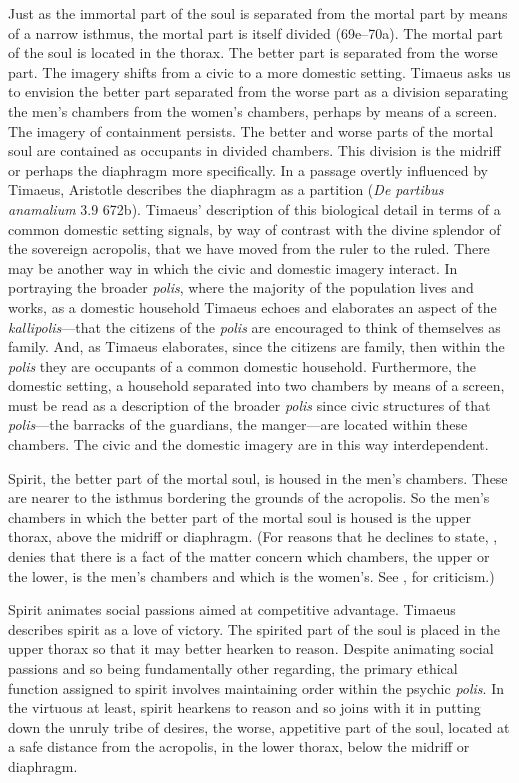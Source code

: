 Just as the immortal part of the soul is separated from the mortal part by means of a narrow isthmus, the mortal part is itself divided (69e--70a). The mortal part of the soul is located in the thorax. The better part is separated from the worse part. The imagery shifts from a civic to a more domestic setting. Timaeus asks us to envision the better part separated from the worse part as a division separating the men's chambers from the women's chambers, perhaps by means of a screen. The imagery of containment persists. The better and worse parts of the mortal soul are contained as occupants in divided chambers. This division is the midriff or perhaps the diaphragm more specifically. In a passage overtly influenced by Timaeus, Aristotle describes the diaphragm as a partition (\emph{De partibus anamalium} 3.9 672b). Timaeus' description of this biological detail in terms of a common domestic setting signals, by way of contrast with the divine splendor of the sovereign acropolis, that we have moved from the ruler to the ruled. There may be another way in which the civic and domestic imagery interact. In portraying the broader \emph{polis}, where the majority of the population lives and works, as a domestic household Timaeus echoes and elaborates an aspect of the \emph{kallipolis}---that the citizens of the \emph{polis} are encouraged to think of themselves as family. And, as Timaeus elaborates, since the citizens are family, then within the \emph{polis} they are occupants of a common domestic household. Furthermore, the domestic setting, a household separated into two chambers by means of a screen, must be read as a description of the broader \emph{polis} since civic structures of that \emph{polis}---the barracks of the guardians, the manger---are located within these chambers. The civic and the domestic imagery are in this way interdependent.

Spirit, the better part of the mortal soul, is housed in the men's chambers. These are nearer to the isthmus bordering the grounds of the acropolis. So the men's chambers in which the better part of the mortal soul is housed is the upper thorax, above the midriff or diaphragm. (For reasons that he declines to state, \citealt[257 n13]{Archer-Hind:1888qd}, denies that there is a fact of the matter concern which chambers, the upper or the lower, is the men's chambers and which is the women's. See \citealt[501]{Taylor:1928qb}, for criticism.)

Spirit animates social passions aimed at competitive advantage. Timaeus describes spirit as a love of victory. The spirited part of the soul is placed in the upper thorax so that it may better hearken to reason. Despite animating social passions and so being fundamentally other regarding, the primary ethical function assigned to spirit involves maintaining order within the psychic \emph{polis}. In the virtuous at least, spirit hearkens to reason and so joins with it in putting down the unruly tribe of desires, the worse, appetitive part of the soul, located at a safe distance from the acropolis, in the lower thorax, below the midriff or diaphragm.


